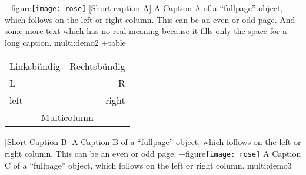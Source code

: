 \documentclass[twoside]{scrartcl}
\begin{document}
\Float[Multi]

\hvFloat[fullpage,multiFloat,capPos=inner,vFill]%
  +{figure}{\texttt{[image: rose]}}%
   [Short caption A]%
   {A Caption A of a ``fullpage'' object, which follows on the left or
    right column. This can be an even or odd page. And some more text which has no
    real meaning because it fills only the space for a long caption.}%
   {multi:demo2}%
  +{table}{\begin{tabular}{lr}\hline                 %
            Linksbündig & Rechtsbündig\\
            L           & R           \\
            left        & right       \\
            \multicolumn{2}{c}{Multicolumn}\\\hline
           \end{tabular}}%
   [Short Caption B]%
   {A Caption B of a ``fullpage'' object, which follows on the left or
        right column. This can be an even or odd page.}{}%
  +{figure}{\texttt{[image: rose]}}%
   {A Caption C of a ``fullpage'' object, which follows on the left or
      right column.}%
   {multi:demo3}




\blinddocument

\Blindtext

\Blindtext
\end{document}
